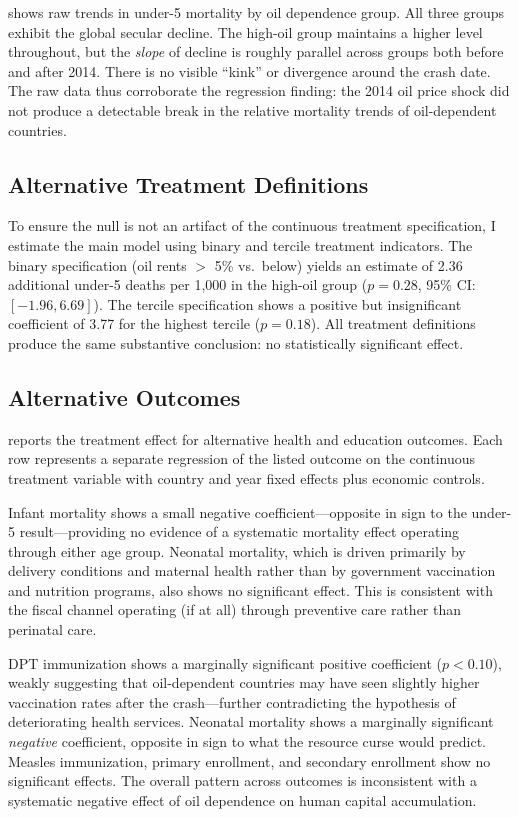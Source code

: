 \documentclass[12pt]{article}
\begin{document}
 shows raw trends in under-5 mortality by oil dependence group. All three groups exhibit the global secular decline. The high-oil group maintains a higher level throughout, but the \textit{slope} of decline is roughly parallel across groups both before and after 2014. There is no visible ``kink'' or divergence around the crash date. The raw data thus corroborate the regression finding: the 2014 oil price shock did not produce a detectable break in the relative mortality trends of oil-dependent countries.

\subsection{Alternative Treatment Definitions}

To ensure the null is not an artifact of the continuous treatment specification, I estimate the main model using binary and tercile treatment indicators. The binary specification (oil rents $>$ 5\% vs.\ below) yields an estimate of 2.36 additional under-5 deaths per 1,000 in the high-oil group ($p = 0.28$, 95\% CI: $[-1.96, 6.69]$). The tercile specification shows a positive but insignificant coefficient of 3.77 for the highest tercile ($p = 0.18$). All treatment definitions produce the same substantive conclusion: no statistically significant effect.

\subsection{Alternative Outcomes}



 reports the treatment effect for alternative health and education outcomes. Each row represents a separate regression of the listed outcome on the continuous treatment variable with country and year fixed effects plus economic controls.

Infant mortality shows a small negative coefficient---opposite in sign to the under-5 result---providing no evidence of a systematic mortality effect operating through either age group. Neonatal mortality, which is driven primarily by delivery conditions and maternal health rather than by government vaccination and nutrition programs, also shows no significant effect. This is consistent with the fiscal channel operating (if at all) through preventive care rather than perinatal care.

DPT immunization shows a marginally significant positive coefficient ($p < 0.10$), weakly suggesting that oil-dependent countries may have seen slightly higher vaccination rates after the crash---further contradicting the hypothesis of deteriorating health services. Neonatal mortality shows a marginally significant \textit{negative} coefficient, opposite in sign to what the resource curse would predict. Measles immunization, primary enrollment, and secondary enrollment show no significant effects. The overall pattern across outcomes is inconsistent with a systematic negative effect of oil dependence on human capital accumulation.
\end{document}
